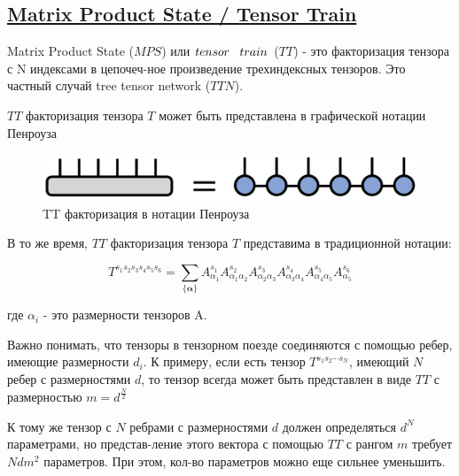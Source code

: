 \subsection{\href{https://tensornetwork.org/mps/}{Matrix Product State / Tensor Train}}



Matrix Product State ($\textit{MPS}$) или $tensor \hspace{3mm} train$ ($\textit{TT}$) - это факторизация тензора с N индексами в цепочеч-ное произведение трехиндексных тензоров. Это частный случай tree tensor network ($\textit{TTN}$).



$\textit{TT}$ факторизация тензора $\textit{T}$ может быть представлена в графической нотации Пенроуза

\begin{figure}[h!tp]
\centering
\includegraphics[scale=0.3]{MatrixProductState_TensorTrain/mpstt_diagram.png}
\caption{TT факторизация в нотации Пенроуза}
\label{fig:TTFactorizationDiag}
\end{figure}

В то же время, $\textit{TT}$ факторизация тензора $\textit{T}$ представима в традиционной нотации:

\begin{equation}
T^{s_1 s_2 s_3 s_4 s_5 s_6} = \sum_{\{\mathbf{\alpha}\}} A^{s_1}_{\alpha_1} 
A^{s_2}_{\alpha_1 \alpha_2}
A^{s_3}_{\alpha_2 \alpha_3} 
A^{s_4}_{\alpha_3 \alpha_4} 
A^{s_5}_{\alpha_4 \alpha_5} 
A^{s_6}_{\alpha_5}
\end{equation}

где $\alpha_i$ - это размерности тензоров A.



Важно понимать, что тензоры в тензорном поезде соединяются с помощью ребер, имеющие размерности $d_i$. К примеру, если есть тензор $T^{s_1 s_2 \cdots s_N}$, имеющий $N$ ребер с размерностями $d$, то тензор всегда может быть представлен в виде $\textit{TT}$ с размерностью $m = d^{\frac{N}{2}}$



К тому же тензор с $N$ ребрами с размерностями $d$
должен определяться $d^N$ параметрами, но представ-ление этого вектора с помощью $\textit{TT}$ с рангом $m$ требует $Ndm^2$ параметров. При этом, кол-во параметров можно еще сильнее уменьшить.



